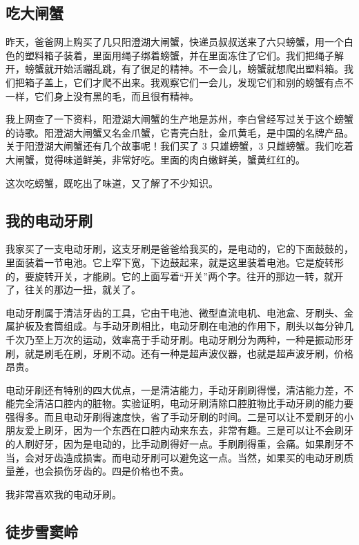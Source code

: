 \documentclass[UTF8,a4paper,titlepage,twoside,10.5pt]{article}
\begin{document}
\subsection{吃大闸蟹}
\label{sec:org62f2eaa}

昨天，爸爸网上购买了几只阳澄湖大闸蟹，快递员叔叔送来了六只螃蟹，用一个白色的塑料箱子装着，里面用绳子绑着螃蟹，并在里面冻住了它们。我们把绳子解开，螃蟹就开始活蹦乱跳，有了很足的精神。不一会儿，螃蟹就想爬出塑料箱。我们把箱子盖上，它们才爬不出来。我观察它们一会儿，发现它们和别的螃蟹有点不一样，它们身上没有黑的毛，而且很有精神。

我上网查了一下资料，阳澄湖大闸蟹的生产地是苏州，李白曾经写过关于这个螃蟹的诗歌。阳澄湖大闸蟹又名金爪蟹，它青壳白肚，金爪黄毛，是中国的名牌产品。关于阳澄湖大闸蟹还有几个故事呢！我们买了 3 只雄螃蟹，3 只雌螃蟹。我们吃着大闸蟹，觉得味道鲜美，非常好吃。里面的肉白嫩鲜美，蟹黄红红的。

这次吃螃蟹，既吃出了味道，又了解了不少知识。

\subsection{我的电动牙刷}
\label{sec:org842758b}

我家买了一支电动牙刷，这支牙刷是爸爸给我买的，是电动的，它的下面鼓鼓的，里面装着一节电池。它上窄下宽，下边鼓起来，就是这里装着电池。它是旋转形的，要旋转开关，才能刷。它的上面写着“开关”两个字。往开的那边一转，就开了，往关的那边一扭，就关了。

电动牙刷属于清洁牙齿的工具，它由干电池、微型直流电机、电池盒、牙刷头、金属护板及套筒组成。与手动牙刷相比，电动牙刷在电池的作用下，刷头以每分钟几千次乃至上万次的运动，效率高于手动牙刷。电动牙刷分为两种，一种是振动形牙刷，就是刷毛在刷，牙刷不动。还有一种是超声波仪器，也就是超声波牙刷，价格昂贵。

电动牙刷还有特别的四大优点，一是清洁能力，手动牙刷刷得慢，清洁能力差，不能完全清洁口腔内的脏物。实验证明，电动牙刷清除口腔脏物比手动牙刷的能力要强得多。而且电动牙刷得速度快，省了手动牙刷的时间。二是可以让不爱刷牙的小朋友爱上刷牙，因为一个东西在口腔内动来东去，非常有趣。三是可以让不会刷牙的人刷好牙，因为是电动的，比手动刷得好一点。手刷刷得重，会痛。如果刷牙不当，会对牙齿造成损害。而电动牙刷可以避免这一点。当然，如果买的电动牙刷质量差，也会损伤牙齿的。四是价格也不贵。

我非常喜欢我的电动牙刷。

\subsection{徒步雪窦岭}
\label{sec:org2002af7}
\end{document}

